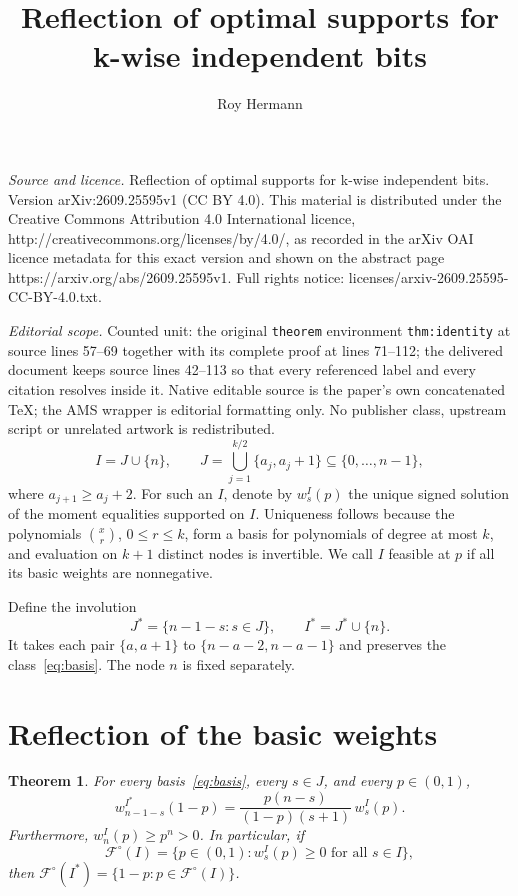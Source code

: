 \documentclass[10pt,a4paper]{amsart}
\newtheorem{theorem}{Theorem}
\newcommand{\Fint}{\mathcal F^{\circ}}
\begin{document}
\title[Reflection of optimal supports for k-wise independent bits]{Reflection of optimal supports for k-wise independent bits}
\author{Roy Hermann}
\date{}
\maketitle
\noindent\emph{Source and licence.} Reflection of optimal supports for k-wise independent bits. Version arXiv:2609.25595v1 (CC BY 4.0). This material is distributed under the Creative Commons Attribution 4.0 International licence, http://creativecommons.org/licenses/by/4.0/, as recorded in the arXiv OAI licence metadata for this exact version and shown on the abstract page https://arxiv.org/abs/2609.25595v1. Full rights notice: licenses/arxiv-2609.25595-CC-BY-4.0.txt.\par\smallskip
\noindent\textit{Editorial scope.} Counted unit: the original \texttt{theorem} environment \texttt{thm:identity} at source lines 57--69 together with its complete proof at lines 71--112; the delivered document keeps source lines 42--113 so that every referenced label and every citation resolves inside it. Native editable source is the paper's own concatenated TeX; the AMS wrapper is editorial formatting only. No publisher class, upstream script or unrelated artwork is redistributed.
\begin{equation}\label{eq:basis}
 I=J\cup\{n\},\qquad
 J=\bigcup_{j=1}^{k/2}\{a_j,a_j+1\}\subseteq\{0,\ldots,n-1\},
\end{equation}
where $a_{j+1}\ge a_j+2$. For such an $I$, denote by $w_s^I(p)$ the unique signed solution of the moment equalities supported on $I$.
Uniqueness follows because the polynomials $\binom{x}{r}$, $0\le r\le k$, form a basis for polynomials of degree at most $k$, and evaluation on $k+1$ distinct nodes is invertible. We call $I$ feasible at $p$ if all its basic weights are nonnegative.

Define the involution
\begin{equation}\label{eq:star}
 J^*=\{n-1-s:s\in J\},\qquad I^*=J^*\cup\{n\}.
\end{equation}
It takes each pair $\{a,a+1\}$ to $\{n-a-2,n-a-1\}$ and preserves the class~\eqref{eq:basis}. The node $n$ is fixed separately.

\section{Reflection of the basic weights}


\begin{theorem}\label{thm:identity}
For every basis~\eqref{eq:basis}, every $s\in J$, and every $p\in(0,1)$,
\begin{equation}\label{eq:identity}
 w_{n-1-s}^{I^*}(1-p)
 =\frac{p(n-s)}{(1-p)(s+1)}\,w_s^I(p).
\end{equation}
Furthermore, $w_n^I(p)\ge p^n>0$.
In particular, if
\[
 \Fint(I)=\{p\in(0,1):w_s^I(p)\ge0\text{ for all }s\in I\},
\]
then $\Fint(I^*)=\{1-p:p\in\Fint(I)\}$.
\end{theorem}
\end{document}
